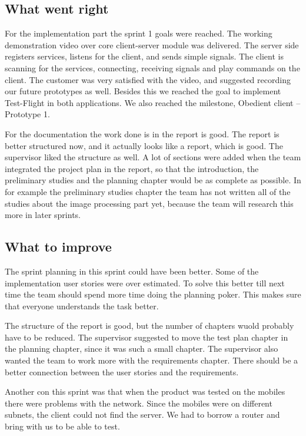 \subsection{What went right}
For the implementation part the sprint 1 goals were reached. The working demonstration video over core client-server module was delivered. The server side registers services, listens for the client, and sends simple  signals. The client is scanning for the services, connecting, receiving signals and play commands on the client. The customer was very satisfied with the video, and suggested recording our future prototypes as well. Besides this we reached the goal to implement Test-Flight in both applications. We also reached the milestone, Obedient client -- Prototype 1.

For the documentation the work done is in the report is good. The report is better structured now, and it actually looks like a report, which is good. The supervisor liked the structure as well. A lot of sections were added when the team integrated the project plan in the report, so that the introduction, the preliminary studies and the planning chapter would be as complete as possible. In for example the preliminary studies chapter the team has not written all of the studies about the image processing part yet, because the team will research this more in later sprints.

\subsection{What to improve}
The sprint planning in this sprint could have been better. Some of the implementation user stories were over estimated. To solve this better till next time the team should spend more time doing the planning poker. This makes sure that everyone understands the task better. 

The structure of the report is good, but the number of chapters wuold probably have to be reduced. The supervisor suggested to move the test plan chapter in the planning chapter, since it was such a small chapter. The supervisor also wanted the team to work more with the requirements chapter. There should be a better connection between the user stories and the requirements.


Another con this sprint was that when the product was tested on the mobiles there were problems with the network. Since the mobiles were on different subnets, the client could not find the server. We had to borrow a router and bring with us to be able to test. 

